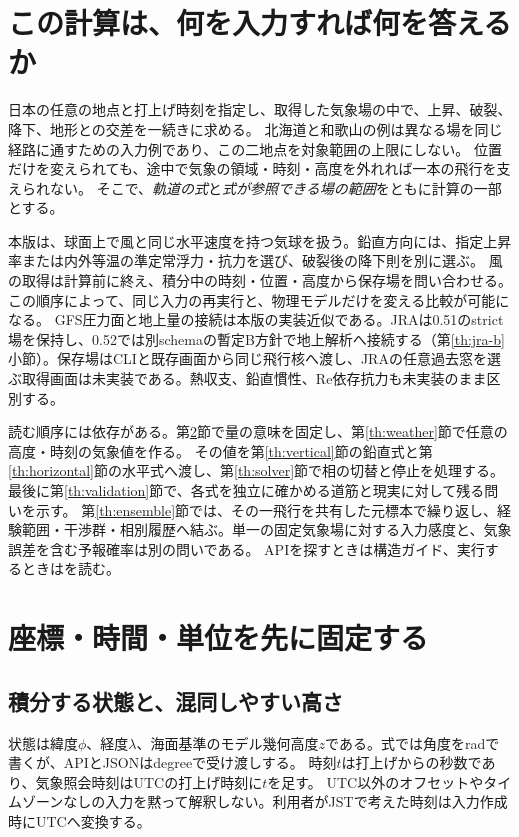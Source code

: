\documentclass[11pt,a4paper]{article}
\begin{document}
\section{この計算は、何を入力すれば何を答えるか}\label{th:purpose}
日本の任意の地点と打上げ時刻を指定し、取得した気象場の中で、上昇、破裂、降下、地形との交差を一続きに求める。
北海道と和歌山の例は異なる場を同じ経路に通すための入力例であり、この二地点を対象範囲の上限にしない。
位置だけを変えられても、途中で気象の領域・時刻・高度を外れれば一本の飛行を支えられない。
そこで、\emph{軌道の式}と\emph{式が参照できる場の範囲}をともに計算の一部とする。

本版は、球面上で風と同じ水平速度を持つ気球を扱う。鉛直方向には、指定上昇率または内外等温の準定常浮力・抗力を選び、破裂後の降下則を別に選ぶ。
風の取得は計算前に終え、積分中の時刻・位置・高度から保存場を問い合わせる。この順序によって、同じ入力の再実行と、物理モデルだけを変える比較が可能になる。
GFS圧力面と地上量の接続は本版の実装近似である。JRAは0.51のstrict場を保持し、0.52では別schemaの暫定B方針で地上解析へ接続する（第\ref{th:jra-b}小節）。保存場はCLIと既存画面から同じ飛行核へ渡し、JRAの任意過去窓を選ぶ取得画面は未実装である。熱収支、鉛直慣性、Re依存抗力も未実装のまま区別する。

読む順序には依存がある。第\ref{th:coordinates}節で量の意味を固定し、第\ref{th:weather}節で任意の高度・時刻の気象値を作る。
その値を第\ref{th:vertical}節の鉛直式と第\ref{th:horizontal}節の水平式へ渡し、第\ref{th:solver}節で相の切替と停止を処理する。
最後に第\ref{th:validation}節で、各式を独立に確かめる道筋と現実に対して残る問いを示す。
第\ref{th:ensemble}節では、その一飛行を共有した元標本で繰り返し、経験範囲・干渉群・相別履歴へ結ぶ。単一の固定気象場に対する入力感度と、気象誤差を含む予報確率は別の問いである。
APIを探すときは構造ガイド、実行するときはを読む。

\section{座標・時間・単位を先に固定する}\label{th:coordinates}
\subsection{積分する状態と、混同しやすい高さ}
状態は緯度$\phi$、経度$\lambda$、海面基準のモデル幾何高度$z$である。式では角度をradで書くが、APIとJSONはdegreeで受け渡しする。
時刻$t$は打上げからの秒数であり、気象照会時刻はUTCの打上げ時刻に$t$を足す。
UTC以外のオフセットやタイムゾーンなしの入力を黙って解釈しない。利用者がJSTで考えた時刻は入力作成時にUTCへ変換する。
\end{document}
